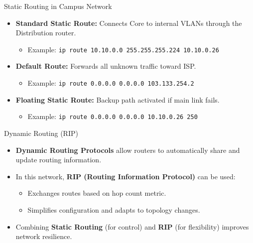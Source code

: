\documentclass[aspectratio=169]{beamer}
\begin{document}
\begin{frame}{Static Routing in Campus Network}
\begin{itemize}
    \item \textbf{Standard Static Route:} Connects Core to internal VLANs through the Distribution router.
    \begin{itemize}
        \item Example: \texttt{ip route 10.10.0.0 255.255.255.224 10.10.0.26}
    \end{itemize}
    \item \textbf{Default Route:} Forwards all unknown traffic toward ISP.
    \begin{itemize}
        \item Example: \texttt{ip route 0.0.0.0 0.0.0.0 103.133.254.2}
    \end{itemize}
    \item \textbf{Floating Static Route:} Backup path activated if main link fails.
    \begin{itemize}
        \item Example: \texttt{ip route 0.0.0.0 0.0.0.0 10.10.0.26 250}
    \end{itemize}
\end{itemize}
\end{frame}

\begin{frame}{Dynamic Routing (RIP)}
\begin{itemize}
    \item \textbf{Dynamic Routing Protocols} allow routers to automatically share and update routing information.
    \item In this network, \textbf{RIP (Routing Information Protocol)} can be used:
    \begin{itemize}
        \item Exchanges routes based on hop count metric.
        \item Simplifies configuration and adapts to topology changes.
    \end{itemize}
    \item Combining \textbf{Static Routing} (for control) and \textbf{RIP} (for flexibility) improves network resilience.
\end{itemize}
\end{frame}
\end{document}
